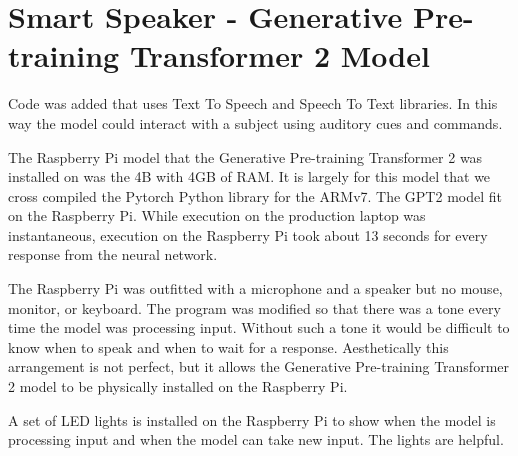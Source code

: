 \section{Smart Speaker - Generative Pre-training Transformer 2 Model}

Code was added that uses Text To Speech and Speech To Text libraries. In this way the model could interact with a subject using auditory cues and commands.

The Raspberry Pi model that the Generative Pre-training Transformer 2 was installed on was the 4B with 4GB of RAM. It is largely for this model that we cross compiled the Pytorch Python library for the ARMv7. The GPT2 model fit on the Raspberry Pi. While execution on the production laptop was instantaneous, execution on the Raspberry Pi took about 13 seconds for every response from the neural network.

The Raspberry Pi was outfitted with a microphone and a speaker but no mouse, monitor, or keyboard. The program was modified so that there was a tone every time the model was processing input. Without such a tone it would be difficult to know when to speak and when to wait for a response. Aesthetically this arrangement is not perfect, but it allows the Generative Pre-training Transformer 2 model to be physically installed on the Raspberry Pi.

A set of LED lights is installed on the Raspberry Pi to show when the model is processing input and when the model can take new input. The lights are helpful.
